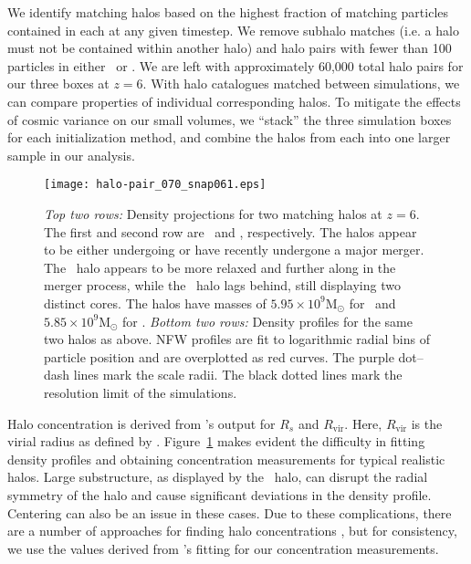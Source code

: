 

We identify matching halos based on the highest fraction of matching particles contained in each at any given timestep.  We remove subhalo matches (i.e. a halo must not be contained within another halo) and halo pairs with fewer than 100 particles in either \lpt\ or \za.  We are left with approximately 60,000 total halo pairs for our three boxes at $z = 6$.  With halo catalogues matched between simulations, we can compare properties of individual corresponding halos.  To mitigate the effects of cosmic variance on our small volumes, we ``stack'' the three simulation boxes for each initialization method, and combine the halos from each into one larger sample in our analysis.






\begin{figure}[t]
    \centering
    \texttt{[image: halo-pair\_070\_snap061.eps]}
	\caption[Comparison of matched \lpt\ and \za\ halos]{\footnotesize \textit{Top two rows:}  Density projections for two matching halos at $z = 6$.  The first and second row are \lpt\ and \za, respectively.  The halos appear to be either undergoing or have recently undergone a major merger.  The \lpt\ halo appears to be more relaxed and further along in the merger process, while the \za\ halo lags behind, still displaying two distinct cores.  The halos have masses of $5.95 \times 10^{9} \textrm{M}_{\odot}$ for \lpt\ and $5.85 \times 10^{9} \textrm{M}_{\odot}$ for \za.  \textit{Bottom two rows:}  Density profiles for the same two halos as above.  NFW profiles are fit to logarithmic radial bins of particle position and are overplotted as red curves.  The purple dot--dash lines mark the scale radii.  The black dotted lines mark the resolution limit of the simulations.}
    \label{fig:halo-pair}
\end{figure}

Halo concentration is derived from \rockstar's output for $R_{s}$ and $R_{\mathrm{vir}}$.  Here, $R_{\mathrm{vir}}$ is the virial radius as defined by \citet{1998ApJ...495...80B}.  Figure~\ref{fig:halo-pair} makes evident the difficulty in fitting density profiles and obtaining concentration measurements for typical realistic halos.  Large substructure, as displayed by the \za\ halo, can disrupt the radial symmetry of the halo and cause significant deviations in the density profile.  Centering can also be an issue in these cases.  Due to these complications, there are a number of approaches for finding halo concentrations \citep{2012MNRAS.423.3018P}, but for consistency, we use the values derived from \rockstar's fitting for our concentration measurements.




